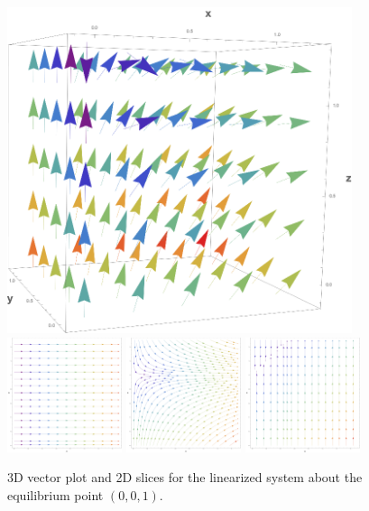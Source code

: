 \documentclass[10pt]{article}
\newcommand{\np}{\vfill\newpage}
\begin{document}
\begin{figure}[h!]
\centering
\includegraphics[width=0.9\textwidth]{thirdeqpoint3d.png} \\
\includegraphics[width=0.3\textwidth]{thirdeqpointxy.png}
\includegraphics[width=0.3\textwidth]{thirdeqpointxz.png}
\includegraphics[width=0.3\textwidth]{thirdeqpointyz.png}
\caption{3D vector plot and 2D slices for the linearized system about the equilibrium point \( (0,0,1) \).}
\label{fig:thirdeqpoint}
\end{figure}
\np
\end{document}
